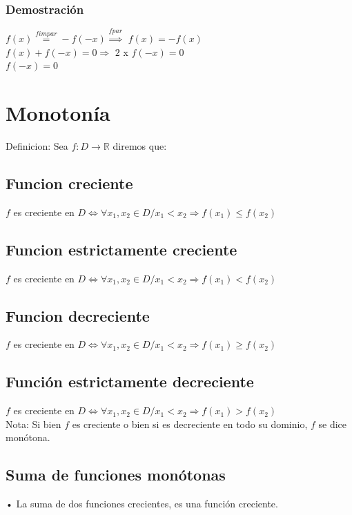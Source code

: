 \subsubsection{Demostración}
\begin{center}

$f(x)\stackrel{f impar}{=}-f(-x)\stackrel{f par}{\Rightarrow}$
$f(x)=-f(x)$\\

$f(x)+f(-x)= 0 \Rightarrow$
$2$ x $f(-x)= 0$\\
$f(-x)= 0$
\end{center}
\section{Monotonía}

Definicion: Sea $f: D \longrightarrow \mathbb{R}$ diremos que:
\subsection{Funcion creciente}
$f$ es creciente en $D \Longleftrightarrow \forall x_{1}, x_{2} \in D / x_{1} < x_{2} \Rightarrow f(x_{1}) \leqslant f(x_{2})$
\subsection{Funcion estrictamente creciente}
$f$ es creciente en $D \Longleftrightarrow \forall x_{1}, x_{2} \in D / x_{1} < x_{2} \Rightarrow f(x_{1}) < f(x_{2})$
\subsection{Funcion decreciente}
$f$ es creciente en $D \Longleftrightarrow \forall x_{1}, x_{2} \in D / x_{1} < x_{2} \Rightarrow f(x_{1}) \geqslant f(x_{2})$
\subsection{Función estrictamente decreciente}
$f$ es creciente en $D \Longleftrightarrow \forall x_{1}, x_{2} \in D / x_{1} < x_{2} \Rightarrow f(x_{1}) > f(x_{2})$\\

Nota: Si bien $f$ es creciente o bien si es decreciente en todo su dominio, $f$ se dice monótona.
\subsection{Suma de funciones monótonas}
• La suma de dos funciones crecientes, es una función creciente.\\

